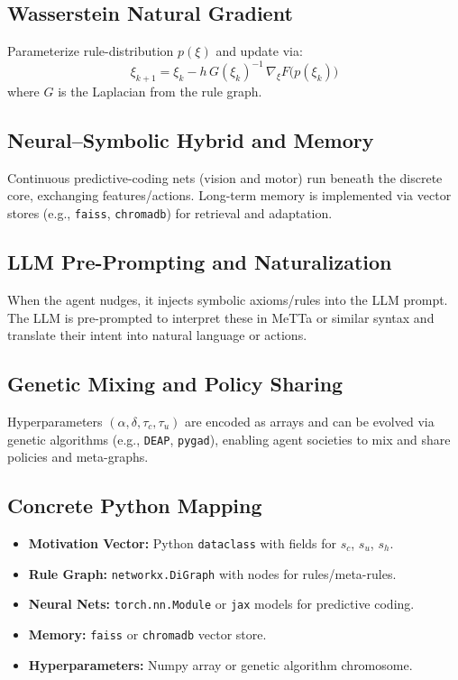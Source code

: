 \documentclass[11pt]{article}
\begin{document}
\subsection{Wasserstein Natural Gradient}
Parameterize rule-distribution $p(\xi)$ and update via:
\[
  \xi_{k+1} = \xi_k - h\,G(\xi_k)^{-1}\,\nabla_{\xi}F\bigl(p(\xi_k)\bigr)
\]
where $G$ is the Laplacian from the rule graph.

\subsection{Neural–Symbolic Hybrid and Memory}
Continuous predictive-coding nets (vision and motor) run beneath the discrete core, exchanging features/actions. Long-term memory is implemented via vector stores (e.g., \texttt{faiss}, \texttt{chromadb}) for retrieval and adaptation.

\subsection{LLM Pre-Prompting and Naturalization}
When the agent nudges, it injects symbolic axioms/rules into the LLM prompt. The LLM is pre-prompted to interpret these in MeTTa or similar syntax and translate their intent into natural language or actions.

\subsection{Genetic Mixing and Policy Sharing}
Hyperparameters $(\alpha,\delta,\tau_c,\tau_u)$ are encoded as arrays and can be evolved via genetic algorithms (e.g., \texttt{DEAP}, \texttt{pygad}), enabling agent societies to mix and share policies and meta-graphs.

\subsection{Concrete Python Mapping}
\begin{itemize}
  \item \textbf{Motivation Vector:} Python \texttt{dataclass} with fields for $s_c$, $s_u$, $s_h$.
  \item \textbf{Rule Graph:} \texttt{networkx.DiGraph} with nodes for rules/meta-rules.
  \item \textbf{Neural Nets:} \texttt{torch.nn.Module} or \texttt{jax} models for predictive coding.
  \item \textbf{Memory:} \texttt{faiss} or \texttt{chromadb} vector store.
  \item \textbf{Hyperparameters:} Numpy array or genetic algorithm chromosome.
\end{itemize}
\end{document}
